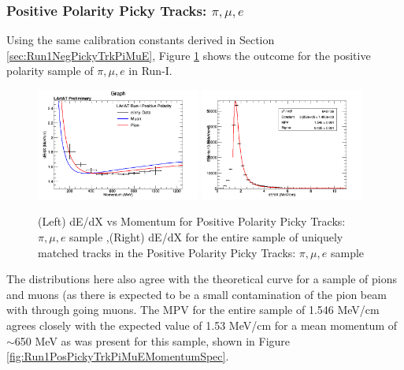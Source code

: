 \subsubsection{Positive Polarity Picky Tracks: $\pi, \mu, e$}\label{sec:Run1PosPickyTrkPiMuE}

Using the same calibration constants derived in Section \ref{sec:Run1NegPickyTrkPiMuE}, Figure \ref{fig:Run1PosPickyTrkPiMuEResults} shows the outcome for the positive polarity sample of $\pi, \mu, e$ in Run-I.

\begin{figure}[htb]
\centering
\includegraphics[width=0.48\textwidth]{images/dEdXvsMomentumPosPolRun1FineBin.png}
\includegraphics[width=0.48\textwidth]{images/dEdXPosPolRun1.png}
\caption{(Left) dE/dX vs Momentum for Positive Polarity Picky Tracks: $\pi, \mu, e$ sample ,(Right) dE/dX for the entire sample of uniquely matched tracks in the Positive Polarity Picky Tracks: $\pi, \mu, e$ sample }
\label{fig:Run1PosPickyTrkPiMuEResults}
\end{figure}

The distributions here also agree with the theoretical curve for a sample of pions and muons (as there is expected to be a small contamination of the pion beam with through going muons. The MPV for the entire sample of 1.546 MeV/cm agrees closely with the expected value of 1.53 MeV/cm for a mean momentum of $\sim$650 MeV as was present for this sample, shown in Figure \ref{fig:Run1PosPickyTrkPiMuEMomentumSpec}.

